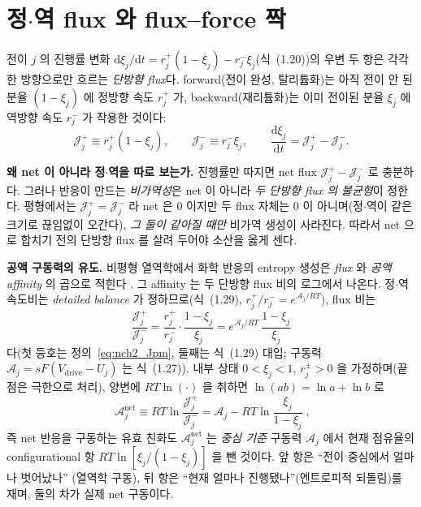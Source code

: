 \documentclass[11pt,a4paper]{article}
\newcommand{\dd}{\mathrm{d}}
\newcommand{\drive}{\mathrm{drive}}
\begin{document}
\section{정$\cdot$역 flux 와 flux--force 짝}\label{sec:nch2_flux}
전이 $j$ 의 진행률 변화 $\dd\xi_j/\dd t=r_j^+(1-\xi_j)-r_j^-\xi_j$(식~(1.20))의 우변 두 항은 각각 한 방향으로만
흐르는 \emph{단방향 flux}다. forward(전이 완성, 탈리튬화)는 아직 전이 안 된 분율 $(1-\xi_j)$ 에 정방향 속도
$r_j^+$ 가, backward(재리튬화)는 이미 전이된 분율 $\xi_j$ 에 역방향 속도 $r_j^-$ 가 작용한 것이다:
\begin{equation}
\mathcal J_j^+\equiv r_j^+(1-\xi_j),\qquad \mathcal J_j^-\equiv r_j^-\xi_j,\qquad
\frac{\dd\xi_j}{\dd t}=\mathcal J_j^+-\mathcal J_j^-.
\label{eq:nch2_Jpm}
\end{equation}

\textbf{왜 net 이 아니라 정$\cdot$역을 따로 보는가.} 진행률만 따지면 net flux $\mathcal J_j^+-\mathcal J_j^-$ 로
충분하다. 그러나 반응이 만드는 \emph{비가역성}은 net 이 아니라 \emph{두 단방향 flux 의 불균형}이 정한다.
평형에서는 $\mathcal J_j^+=\mathcal J_j^-$ 라 net 은 $0$ 이지만 두 flux 자체는 $0$ 이 아니며(정$\cdot$역이 같은
크기로 끊임없이 오간다), \emph{그 둘이 같아질 때만} 비가역 생성이 사라진다. 따라서 net 으로 합치기 전의 단방향
flux 를 살려 두어야 소산을 옳게 센다.

\textbf{공액 구동력의 유도.} 비평형 열역학에서 화학 반응의 entropy 생성은 \emph{flux} 와 \emph{공액 affinity} 의
곱으로 적힌다 \cite{degrootmazur1962,prigogine1967}. 그 affinity 는 두 단방향 flux 비의 로그에서 나온다. 정$\cdot$역
속도비는 \emph{detailed balance} 가 정하므로(식~(1.29), $r_j^+/r_j^-=e^{\mathcal A_j/RT}$), flux 비는
\begin{equation}
\frac{\mathcal J_j^+}{\mathcal J_j^-}=\frac{r_j^+}{r_j^-}\cdot\frac{1-\xi_j}{\xi_j}
=e^{\mathcal A_j/RT}\,\frac{1-\xi_j}{\xi_j}
\label{eq:nch2_Jratio}
\end{equation}
다(첫 등호는 정의~\eqref{eq:nch2_Jpm}, 둘째는 식~(1.29) 대입; 구동력 $\mathcal A_j=sF(V_\drive-U_j)$ 는
식~(1.27)). 내부 상태 $0<\xi_j<1$, $r_j^\pm>0$ 을 가정하며(끝점은 극한으로 처리), 양변에 $RT\ln(\cdot)$ 을
취하면 $\ln(ab)=\ln a+\ln b$ 로
\begin{equation}
\boxed{\;\mathcal A_j^{\mathrm{net}}\equiv RT\ln\frac{\mathcal J_j^+}{\mathcal J_j^-}
=\mathcal A_j-RT\ln\frac{\xi_j}{1-\xi_j}\;,}
\label{eq:nch2_Anet}
\end{equation}
즉 net 반응을 구동하는 유효 친화도 $\mathcal A_j^{\mathrm{net}}$ 는 \emph{중심 기준} 구동력 $\mathcal A_j$ 에서
현재 점유율의 configurational 항 $RT\ln[\xi_j/(1-\xi_j)]$ 을 뺀 것이다. 앞 항은 ``전이 중심에서 얼마나 벗어났나''
(열역학 구동), 뒤 항은 ``현재 얼마나 진행됐나''(엔트로피적 되돌림)를 재며, 둘의 차가 실제 net 구동이다.
\end{document}
